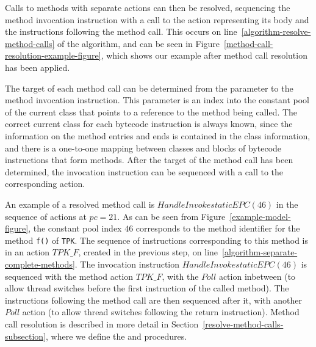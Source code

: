 Calls to methods with separate actions can then be resolved,
sequencing the method invocation instruction with a call to the
\Circus{} action representing its body and the instructions following
the method call. 
This occurs on line~\ref{algorithm-resolve-method-calls} of the
algorithm, and can be seen in
Figure~\ref{method-call-resolution-example-figure}, which shows our
example after method call resolution has been applied.

The target of each method call can be determined from the parameter to
the method invocation instruction.
This parameter is an index into the constant pool of the current class
that points to a reference to the method being called.
The correct current class for each bytecode instruction is always
known, since the information on the method entries and ends is
contained in the class information, and there is a one-to-one mapping
between classes and blocks of bytecode instructions that form methods.
After the target of the method call has been determined, the
invocation instruction can be sequenced with a call to the
corresponding \Circus{} action.

An example of a resolved method call is $HandleInvokestaticEPC(46)$ in
the sequence of actions at $pc = 21$.
As can be seen from Figure~\ref{example-model-figure}, the constant
pool index $46$ corresponds to the method identifier for the method
\texttt{f()} of \texttt{TPK}.
The sequence of instructions corresponding to this method is in an
action $TPK\_F$, created in the previous step, on
line~\ref{algorithm-separate-complete-methods}.
The invocation instruction $HandleInvokestaticEPC(46)$ is sequenced
with the method action $TPK\_F$, with the $Poll$ action inbetween (to
allow thread switches before the first instruction of the called
method).
The instructions following the method call are then sequenced after
it, with another $Poll$ action (to allow thread switches following the
return instruction).
Method call resolution is described in more detail in
Section~\ref{resolve-method-calls-subsection}, where we define the
 and 
procedures.

